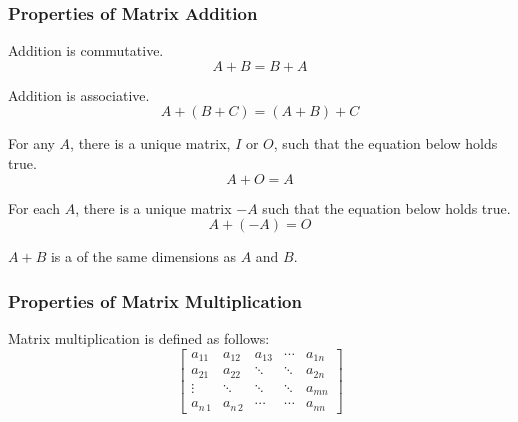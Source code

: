 \subsubsection{Properties of Matrix Addition}\label{subsubsec:Properties_Matrix_Addition}
\begin{propertylist}
\item {} Addition is commutative.\label{prop:Matrix_Add_Commutative}
  \begin{equation}\label{eq:Matrix_Add_Commutative}
    A+B = B+A
  \end{equation}

\item {} Addition is associative.\label{prop:Matrix_Add_Associative}
  \begin{equation}\label{eq:Matrix_Add_Associative}
    A+(B+C) = (A+B) + C
  \end{equation}

\item For any  $A$, there is a unique matrix, $I$ or $O$, such that the equation below holds true.\label{prop:Matrix_Additive_Identity}
  \begin{equation}\label{eq:Matrix_Additive_Identity}
    A+O = A
  \end{equation}

\item For each  $A$, there is a unique matrix $-A$ such that the equation below holds true.\label{prop:Matrix_Additive_Inverse}
  \begin{equation}\label{eq:Matrix_Additive_Inverse}
    A+(-A) = O
  \end{equation}

\item $A+B$ is a  of the same dimensions as $A$ and $B$.\label{prop:Matrix_Addition_Closure}
\end{propertylist}

\subsubsection{Properties of Matrix Multiplication}\label{subsubsec:Properties_Matrix_Multiplication}
Matrix multiplication is defined as follows:
\begin{equation}\label{eq:Matrix_Multiplication}
  \begin{bmatrix}
    a_{11} & a_{12} & a_{13} & \cdots & a_{1n} \\
    a_{21} & a_{22} & \ddots & \ddots & a_{2n} \\
    \vdots & \ddots & \ddots & \ddots & a_{mn} \\
    a_{n\,1} & a_{n\,2} & \cdots & \cdots & a_{nn}
  \end{bmatrix}
\end{equation}

